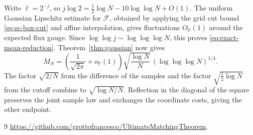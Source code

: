 \documentclass[11pt]{article}
\newcommand{\1}{\mathbf{1}}
\numberwithin{equation}{section}
\begin{document}
Write \(\ell=2^{-j}\), so
\(j\log 2=\frac12\log N-10\log\log N+O(1)\).
The uniform Gaussian Lipschitz estimate for \(\mathcal F\), obtained
by applying the grid cut bound \eqref{eq:sc-box-cut} and affine
interpolation, gives fluctuations
\(O_{\mathbb P}(1)\) around the expected flux gauge.
Since \(\log\log j\sim\log\log\log N\), this proves
\eqref{eq:exact-mean-reduction}. Theorem~\ref{thm:gaussian} now gives
\[
 M_N=\left(\frac{1}{\sqrt{2\pi}}+o_{\mathbb P}(1)\right)
         \sqrt{\frac{\log N}{N}}\,(\log\log\log N)^{1/4}.
\]
The factor \(\sqrt{2/N}\) from the difference of the samples and the
factor \(\sqrt{\frac12\log N}\) from the cutoff combine to
\(\sqrt{\log N/N}\). Reflection in the diagonal of the square preserves
the joint sample law and exchanges the coordinate costs, giving the
other endpoint.

\begin{thebibliography}{9}
\url{https://github.com/grottofrancesco/UltimateMatchingTheorem}.
\end{thebibliography}
\end{document}
